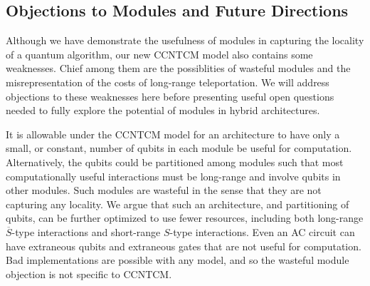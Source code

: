 




\subsection{Objections to Modules and Future Directions}
\label{subsec:module-size}

Although we have demonstrate the usefulness of modules in capturing
the locality of a quantum algorithm, our new \textsf{CCNTCM} model also
contains some weaknesses. Chief among them are the possiblities of
wasteful modules
and the misrepresentation of the costs of long-range teleportation. We will
address objections to these weaknesses here before presenting useful
open questions needed to fully explore the potential of modules in
hybrid architectures.

It is allowable under the \textsf{CCNTCM} model for an architecture
to have only a small,
or constant, number of qubits in each module be useful for computation.
Alternatively, the qubits could be partitioned among modules such that most
computationally useful interactions must be long-range and involve
qubits in other modules.
Such modules are wasteful in the sense that they are not capturing any
locality.
We argue that such an architecture, and partitioning of qubits, can be
further optimized to use fewer resources, including both long-range
$\overline{S}$-type interactions and short-range $S$-type interactions.
Even an \textsf{AC} circuit can have extraneous
qubits and extraneous gates that are not useful for computation.
Bad implementations are possible with any model, and so the wasteful module
objection is not specific to \textsf{CCNTCM}.

